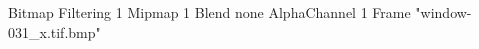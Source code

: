 {Bitmap
	{Filtering 1}
	{Mipmap 1}
	{Blend none}
	{AlphaChannel 1}
	{Frame "window-031_x.tif.bmp"}
}
